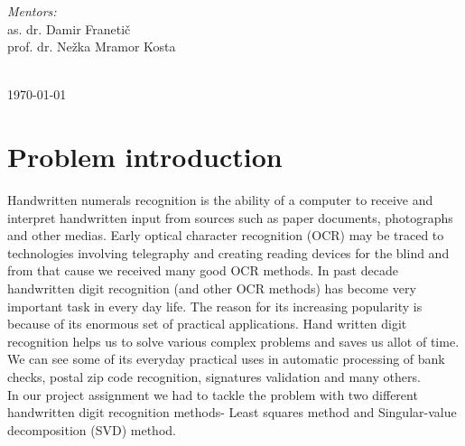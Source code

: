 \documentclass[12pt]{article}
\begin{document}
\begin{titlepage}
\begin{minipage}{0.5\textwidth}
\begin{flushleft} \large
	\emph{Mentors:}\\
	as. dr. Damir Franetič\\ %
	prof. dr. Nežka Mramor Kosta \vspace{0.7 cm}\\ %
\end{flushleft}


\end{minipage}\\[2cm]


{\large \today}\\[2cm] %

\vfill %

\end{titlepage}

\tableofcontents
\newpage
\listoffigures
\newpage

\section{Problem introduction}
Handwritten numerals recognition  is the ability of a computer to receive and interpret handwritten input from sources such as paper documents, photographs and other medias. Early optical character recognition (OCR) may be traced to technologies involving telegraphy and creating reading devices for the blind and from that cause we received many good OCR methods. In past decade handwritten digit recognition (and other OCR methods) has become very important task in every day life. The reason for its increasing popularity is because of its enormous set of practical applications. Hand written digit recognition helps us to solve various complex problems and saves us allot of time. We can see some of its everyday practical uses in automatic processing of bank checks, postal zip code recognition, signatures validation and many others.\\
\newline
In our project assignment we had to tackle the problem with two different handwritten digit recognition methods- Least squares method and Singular-value decomposition (SVD) method.
\end{document}
